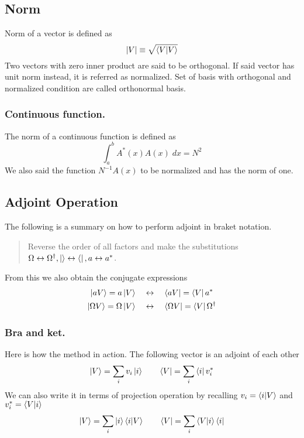 \documentclass[../main.tex]{subfiles}
\begin{document}
\subsection{Norm}
Norm of a vector is defined as
\begin{equation*}
	|V|\equiv\sqrt{\braket{V|V}}
\end{equation*}
Two vectors with zero inner product are said to be orthogonal.
If said vector has unit norm instead, it is referred as normalized.
Set of basis with orthogonal and normalized condition are called orthonormal basis.

\subsubsection{Continuous function.}
The norm of a continuous function is defined as
\begin{equation*}
	\int_{a}^{b}A^*(x)A(x)\;dx=N^2
\end{equation*}
We also said the function $N^{-1}A(x)$ to be normalized and has the norm of one.

\subsection{Adjoint Operation}
The following is a summary on how to perform adjoint in braket notation.
\begin{quotation}
	Reverse the order of all factors and make the substitutions $\Omega\leftrightarrow\Omega^\dagger,\ket{}\leftrightarrow \bra{}, a\leftrightarrow a^*$.
\end{quotation}
From this we also obtain the conjugate expressions
\begin{align*}
	\ket{aV}=a \ket{V}\quad            & \leftrightarrow \quad\bra{aV}=\bra{V}a^*                 \\
	\ket{\Omega V}=\Omega \ket{V}\quad & \leftrightarrow\quad\bra{\Omega V}=\bra{V}\Omega^\dagger
\end{align*}

\subsubsection{Bra and ket.}
Here is how the method in action.
The following vector is an adjoint of each other
\begin{equation*}
	\ket{V}=\sum_iv_i \ket{i}\qquad \bra{V}=\sum_i \bra{i}v_i^*
\end{equation*}
We can also write it in terms of projection operation by recalling $v_i=\braket{i|V}$ and $v_i^*=\braket{V|i}$
\begin{equation*}
	\ket{V}=\sum_i \ket{i} \braket{i|V}\qquad \bra{V}=\sum_i \braket{V|i}\bra{i}
\end{equation*}
\end{document}
